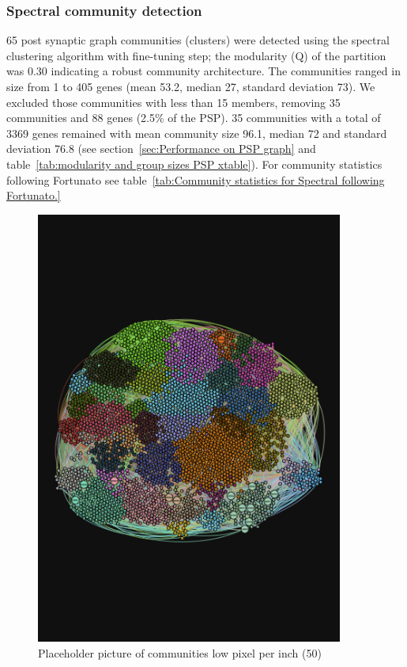 \subsubsection{Spectral community detection}
65 post synaptic graph communities (clusters) were detected using the spectral clustering algorithm with fine-tuning step; the modularity (Q) of the partition was 0.30 indicating a robust community architecture.  The communities ranged in size from 1 to 405 genes (mean 53.2, median 27, standard deviation 73). We excluded those communities with less than 15 members, removing 35 communities and 88 genes (2.5\% of the PSP). 35 communities with a total of 3369 genes remained with mean community size 96.1, median 72 and standard deviation 76.8 (see section~\ref{sec:Performance on PSP graph} and table~\ref{tab:modularity and group sizes PSP xtable}). For community statistics following Fortunato \cite{fortunato2016community} see table~\ref{tab:Community statistics for Spectral following Fortunato.} 


\begin{figure}
    \centering
    \includegraphics[width=0.9\textwidth]{images/chapter_community_detection/from_slides/network_png_50.png}
    \caption{Placeholder picture of communities low pixel per inch (50)}
    \label{fig:communities_spectral}
\end{figure}


